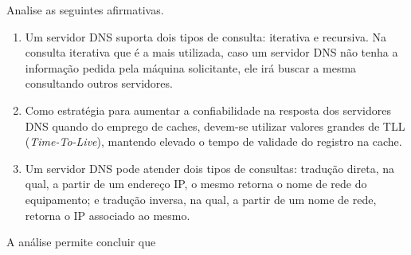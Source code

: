 %
{
\def\AMCbeginQuestion#1#2{\par\noindent{\bf (POSCOMP 2008 - Questão 07)}}
\begin{question}{} Analise as seguintes afirmativas.
\begin{enumerate}[label=\Roman*.]
\item Um servidor DNS suporta dois tipos de consulta: iterativa e recursiva. Na consulta iterativa que é a mais utilizada, caso um servidor DNS não tenha a informação pedida pela máquina solicitante, ele irá buscar a mesma consultando outros servidores.
\item Como estratégia para aumentar a confiabilidade na resposta dos servidores DNS quando do emprego de caches, devem-se utilizar valores grandes de TLL (\textit{Time-To-Live}), mantendo elevado o tempo de validade do registro na cache.
\item Um servidor DNS pode atender dois tipos de consultas: tradução direta, na qual, a partir de um endereço IP, o mesmo retorna o nome de rede do equipamento; e tradução inversa, na qual, a partir de um nome de rede, retorna o IP associado ao mesmo.
\end{enumerate}
A análise permite concluir que
\begin{choices}
\end{choices}
\end{question}
}
%
